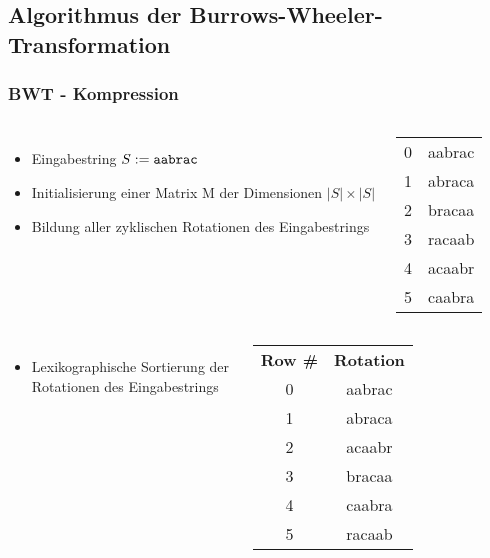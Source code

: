 \documentclass[14pt,xcolor=dvipsnames,pdftex]{beamer}
\begin{document}
\subsection{Algorithmus der Burrows-Wheeler-Transformation}
\begin{frame}[allowframebreaks]
 \frametitle{BWT - Kompression}
    \begin{columns}[c,onlytextwidth]
    \begin{itemize}
	\item Eingabestring $S := \text{\texttt{aabrac}}$	
	\item Initialisierung einer Matrix M der Dimensionen $|S| \times |S|$
	\item Bildung aller zyklischen Rotationen des Eingabestrings
    \end{itemize}
    \begin{center}
    \begin{tabular}{T|T}
    0 & aabrac \\
    1 & abraca \\
    2 & bracaa \\
    3 & racaab \\
    4 & acaabr \\
    5 & caabra \\
    \end{tabular}
    \end{center}
    \end{columns}
\framebreak
\begin{columns}[c,onlytextwidth]
 \begin{itemize}
  \item Lexikographische Sortierung der Rotationen des Eingabestrings
 \end{itemize}
    \begin{tabular}{c|c}
    \textbf{Row \#} & \textbf{Rotation} \\
    0 & aabrac \\
    1 & abraca \\
    2 & acaabr \\
    3 & bracaa \\
    4 & caabra \\
    5 & racaab \\
    \end{tabular}
\end{columns}
\framebreak
\begin{columns}[c,onlytextwidth]

\end{columns}
\end{frame}
\end{document}
